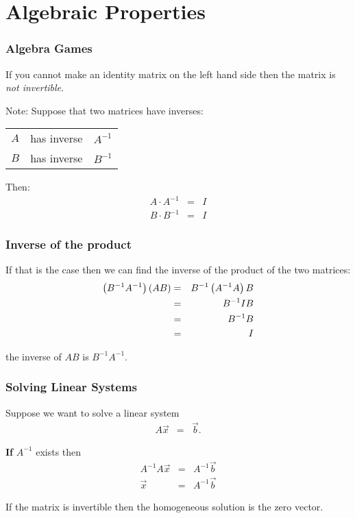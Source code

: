 \section{Algebraic Properties}

\begin{frame}
  \frametitle{Algebra Games}

  If you cannot make an identity matrix on the left hand side then the
  matrix is \textit{not invertible}.

  Note: Suppose that two matrices have inverses: \\
  \begin{tabular}{lll}
    $A$ & has inverse & $A^{-1}$ \\
    $B$ & has inverse & $B^{-1}$
  \end{tabular}

  Then:
  \begin{eqnarray*}
    A \cdot A^{-1} & = & I \\
    B \cdot B^{-1} & = & I
  \end{eqnarray*}
\end{frame}


\begin{frame}
  \frametitle{Inverse of the product}

  If that is the case then we can find the inverse of the product of
  the two matrices:
  \begin{eqnarray*}
    \left( B^{-1} A^{-1} \right) \left( A B \right) & = & B^{-1} \left( A^{-1} A \right) B \\
    & = & B^{-1} I B \\
    & = & B^{-1} B \\
    & = & I
  \end{eqnarray*}

  the inverse of $AB$ is $B^{-1}A^{-1}$.

\end{frame}


\begin{frame}
  \frametitle{Solving Linear Systems}

  Suppose we want to solve a linear system
  \begin{eqnarray*}
    A \vec{x} & = & \vec{b}.
  \end{eqnarray*}

  \textbf{If} $A^{-1}$ exists then 
  \begin{eqnarray*}
    A^{-1} A \vec{x} & = & A^{-1} \vec{b} \\
    \vec{x} & = & A^{-1} \vec{b}
  \end{eqnarray*}

  If the matrix is invertible then the homogeneous solution is the
  zero vector.

\end{frame}

